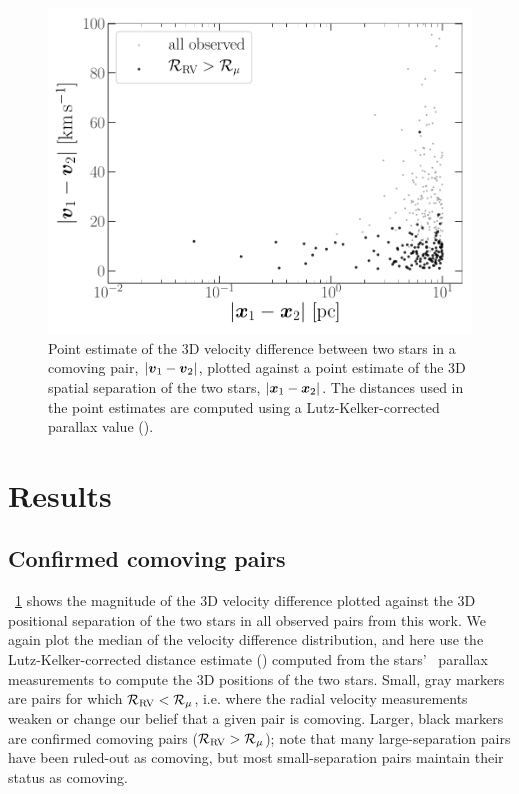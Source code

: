 \documentclass[modern, letterpaper]{aastex61}
\newcommand{\tgas}{\acronym{TGAS}}
\newcommand{\llrold}{\ensuremath{\mathcal{R}_\mu}}
\newcommand{\llrnew}{\ensuremath{\mathcal{R}_{\rm RV}}}
\begin{document}
\begin{figure}[htb]
  \begin{center}
    \includegraphics[width=0.9\linewidth]{dx-dv.pdf}
  \end{center}
  \caption{%
    Point estimate of the 3D velocity difference between two stars in a comoving
    pair, $|\boldsymbol{v}_1 - \boldsymbol{v}_2|$, plotted against a point estimate of the 3D
    spatial separation of the two stars, $|\boldsymbol{x}_1 - \boldsymbol{x}_2|$.
    The distances used in the point estimates are computed using a
    Lutz-Kelker-corrected parallax value (\citealt{Lutz:1973}).
    \label{fig:dx-dv}}
\end{figure}

\section{Results} \label{sec:results}

\subsection{Confirmed comoving pairs}\label{sec:genuine}

\figurename~\ref{fig:dx-dv} shows the magnitude of the 3D velocity difference
plotted against the 3D positional separation of the two stars in all observed
pairs from this work.
We again plot the median of the velocity difference distribution, and here use
the Lutz-Kelker-corrected distance estimate (\citealt{Lutz:1973}) computed from
the stars' \tgas\ parallax measurements to compute the 3D positions of the two
stars.
Small, gray markers are pairs for which $\llrnew < \llrold$, i.e. where the
radial velocity measurements weaken or change our belief that a given pair is
comoving.
Larger, black markers are confirmed comoving pairs ($\llrnew > \llrold$); note
that many large-separation pairs have been ruled-out as comoving, but
most small-separation pairs maintain their status as comoving.
\end{document}
